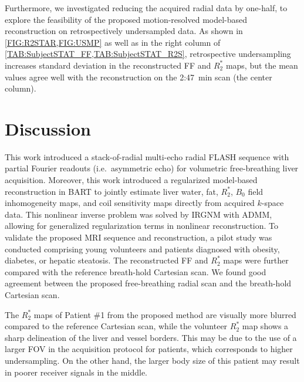 \documentclass[journal,twoside,web]{ieeecolor}
\begin{document}
Furthermore, we investigated reducing the acquired radial data by one-half, 
to explore the feasibility of the proposed motion-resolved model-based reconstruction 
on retrospectively undersampled data. 
As shown in \cref{FIG:R2STAR,FIG:USMP} as well as in the right column of 
\cref{TAB:SubjectSTAT_FF,TAB:SubjectSTAT_R2S}, retrospective undersampling 
increases standard deviation in the reconstructed FF and $R_2^*$ maps, 
but the mean values agree well with the reconstruction on the 2:47~min scan (the center column).



\section{Discussion}

This work introduced a stack-of-radial multi-echo radial FLASH sequence 
with partial Fourier readouts (i.e.~asymmetric echo) 
for volumetric free-breathing liver acquisition. 
Moreover, this work introduced a regularized model-based reconstruction 
in BART to jointly estimate liver water, fat, $R_2^*$, 
$B_0$ field inhomogeneity maps, and coil sensitivity maps 
directly from acquired $k$-space data. 
This nonlinear inverse problem was solved by IRGNM with ADMM, 
allowing for generalized regularization terms in nonlinear reconstruction. 
To validate the proposed MRI sequence and reconstruction, 
a pilot study was conducted comprising young volunteers and 
patients diagnosed with obesity, diabetes, or hepatic steatosis. 
The reconstructed FF and $R_2^*$ maps were further compared with 
the reference breath-hold Cartesian scan. 
We found good agreement between the proposed free-breathing radial scan 
and the breath-hold Cartesian scan.

The $R_2^*$ maps of Patient \#1 from the proposed method are visually more blurred 
compared to the reference Cartesian scan, 
while the volunteer $R_2^*$ map shows a sharp delineation of the liver and vessel borders. 
This may be due to the use of a larger FOV in the acquisition protocol for patients, 
which corresponds to higher undersampling. 
On the other hand, the larger body size of this patient 
may result in poorer receiver signals in the middle.
\end{document}
